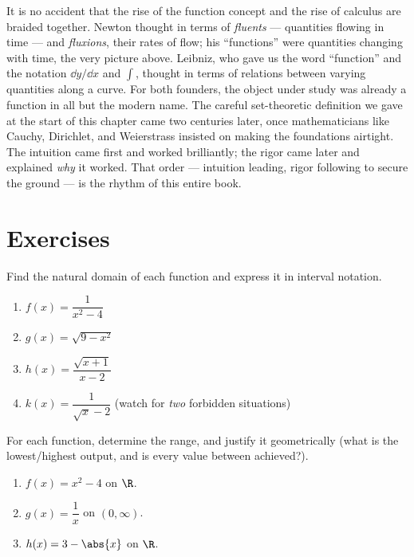 \begin{historybox}
It is no accident that the rise of the function concept and the rise of calculus
are braided together. Newton thought in terms of \emph{fluents} --- quantities
flowing in time --- and \emph{fluxions}, their rates of flow; his ``functions''
were quantities changing with time, the very picture above. Leibniz, who gave us
the word ``function'' and the notation $\dd y/\dd x$ and $\int$, thought in terms
of relations between varying quantities along a curve. For both founders, the
object under study was already a function in all but the modern name. The careful
set-theoretic definition we gave at the start of this chapter came two centuries
later, once mathematicians like Cauchy, Dirichlet, and Weierstrass insisted on
making the foundations airtight. The intuition came first and worked
brilliantly; the rigor came later and explained \emph{why} it worked. That order
--- intuition leading, rigor following to secure the ground --- is the rhythm of
this entire book.
\end{historybox}

\section{Exercises}
\label{ch02:exercises}

\begin{exercise}
\label{ch02:exc-domains}
Find the natural domain of each function and express it in interval notation.
\begin{enumerate}
  \item $f(x) = \dfrac{1}{x^2 - 4}$
  \item $g(x) = \sqrt{9 - x^2}$
  \item $h(x) = \dfrac{\sqrt{x+1}}{x - 2}$
  \item $k(x) = \dfrac{1}{\sqrt{x} - 2}$ \quad (watch for \emph{two} forbidden
        situations)
\end{enumerate}
\end{exercise}

\begin{exercise}
\label{ch02:exc-range}
For each function, determine the range, and justify it geometrically (what is the
lowest/highest output, and is every value between achieved?).
\begin{enumerate}
  \item $f(x) = x^2 - 4$ on $\R$.
  \item $g(x) = \dfrac{1}{x}$ on $(0, \infty)$.
  \item $h(x) = 3 - \abs{x}$ on $\R$.
\end{enumerate}
\end{exercise}

